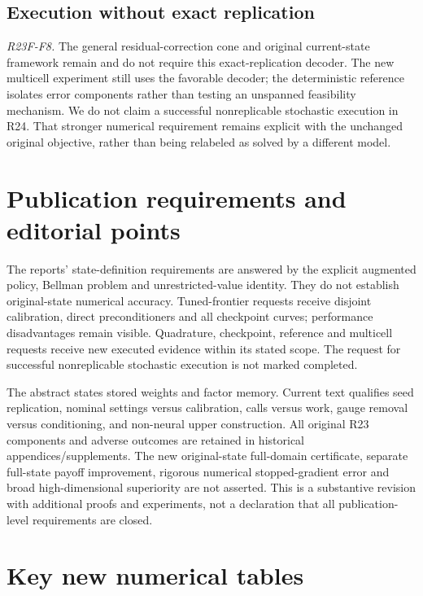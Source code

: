 \subsection{Execution without exact replication}
\noindent\textit{R23F-F8.}
The general residual-correction cone and original current-state framework remain and do not require this exact-replication decoder. The new multicell experiment still uses the favorable decoder; the deterministic reference isolates error components rather than testing an unspanned feasibility mechanism. We do not claim a successful nonreplicable stochastic execution in R24. That stronger numerical requirement remains explicit with the unchanged original objective, rather than being relabeled as solved by a different model.

\section{Publication requirements and editorial points}
The reports' state-definition requirements are answered by the explicit augmented policy, Bellman problem and unrestricted-value identity. They do not establish original-state numerical accuracy. Tuned-frontier requests receive disjoint calibration, direct preconditioners and all checkpoint curves; performance disadvantages remain visible. Quadrature, checkpoint, reference and multicell requests receive new executed evidence within its stated scope. The request for successful nonreplicable stochastic execution is not marked completed.

The abstract states stored weights and factor memory. Current text qualifies seed replication, nominal settings versus calibration, calls versus work, gauge removal versus conditioning, and non-neural upper construction. All original R23 components and adverse outcomes are retained in historical appendices/supplements. The new original-state full-domain certificate, separate full-state payoff improvement, rigorous numerical stopped-gradient error and broad high-dimensional superiority are not asserted. This is a substantive revision with additional proofs and experiments, not a declaration that all publication-level requirements are closed.

\section{Key new numerical tables}




